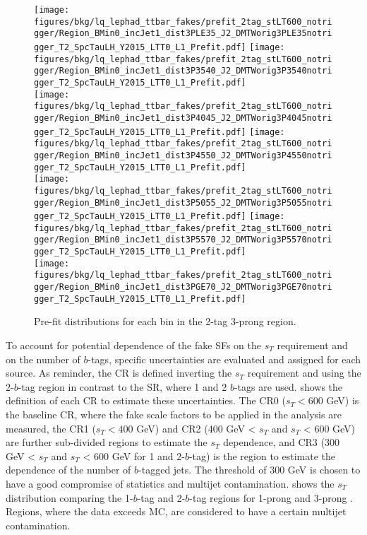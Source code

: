 \begin{figure}
    \centering
    \texttt{[image: figures/bkg/lq\_lephad\_ttbar\_fakes/prefit\_2tag\_stLT600\_notrigger/Region\_BMin0\_incJet1\_dist3PLE35\_J2\_DMTWorig3PLE35notrigger\_T2\_SpcTauLH\_Y2015\_LTT0\_L1\_Prefit.pdf]}
    \texttt{[image: figures/bkg/lq\_lephad\_ttbar\_fakes/prefit\_2tag\_stLT600\_notrigger/Region\_BMin0\_incJet1\_dist3P3540\_J2\_DMTWorig3P3540notrigger\_T2\_SpcTauLH\_Y2015\_LTT0\_L1\_Prefit.pdf]} \\
    \texttt{[image: figures/bkg/lq\_lephad\_ttbar\_fakes/prefit\_2tag\_stLT600\_notrigger/Region\_BMin0\_incJet1\_dist3P4045\_J2\_DMTWorig3P4045notrigger\_T2\_SpcTauLH\_Y2015\_LTT0\_L1\_Prefit.pdf]}
    \texttt{[image: figures/bkg/lq\_lephad\_ttbar\_fakes/prefit\_2tag\_stLT600\_notrigger/Region\_BMin0\_incJet1\_dist3P4550\_J2\_DMTWorig3P4550notrigger\_T2\_SpcTauLH\_Y2015\_LTT0\_L1\_Prefit.pdf]} \\
    \texttt{[image: figures/bkg/lq\_lephad\_ttbar\_fakes/prefit\_2tag\_stLT600\_notrigger/Region\_BMin0\_incJet1\_dist3P5055\_J2\_DMTWorig3P5055notrigger\_T2\_SpcTauLH\_Y2015\_LTT0\_L1\_Prefit.pdf]}
    \texttt{[image: figures/bkg/lq\_lephad\_ttbar\_fakes/prefit\_2tag\_stLT600\_notrigger/Region\_BMin0\_incJet1\_dist3P5570\_J2\_DMTWorig3P5570notrigger\_T2\_SpcTauLH\_Y2015\_LTT0\_L1\_Prefit.pdf]} \\
    \texttt{[image: figures/bkg/lq\_lephad\_ttbar\_fakes/prefit\_2tag\_stLT600\_notrigger/Region\_BMin0\_incJet1\_dist3PGE70\_J2\_DMTWorig3PGE70notrigger\_T2\_SpcTauLH\_Y2015\_LTT0\_L1\_Prefit.pdf]}
  \caption{Pre-fit \mtw distributions for each \pT bin in the 2-tag 3-prong region.}
  \label{fig:lq_ttbarfake_mtw_3p_prefit}
\end{figure}

To account for potential dependence of the fake SFs on the $s_T$ requirement and on the number of $b$-tags, specific
uncertainties are evaluated and assigned for each source. As reminder, the CR is defined inverting the $s_T$ requirement 
and using the 2-$b$-tag region in contrast to the SR, where 1 and 2 $b$-tags are used.  
shows the definition of each CR to estimate these uncertainties. The CR0 ($s_T < 600$ GeV) is the baseline CR, where the
fake scale factors to be applied in the analysis are measured, the CR1 ($s_T < 400$ GeV) and CR2 
(400 GeV < $s_T$ and $s_T$ < 600 GeV) are further sub-divided regions to estimate the $s_T$ dependence,
and CR3 (300 GeV < $s_T$ and $s_T$ < 600 GeV for 1 and 2-$b$-tag) is the region to estimate the dependence of the number 
of $b$-tagged jets. The threshold of 300 GeV is chosen to have a good compromise of statistics and multijet contamination.
 shows the $s_T$ distribution comparing the 1-$b$-tag and 2-$b$-tag regions 
for 1-prong \tauhad and 3-prong \tauhad. Regions, where the data exceeds MC, are considered to have a certain multijet 
contamination.

